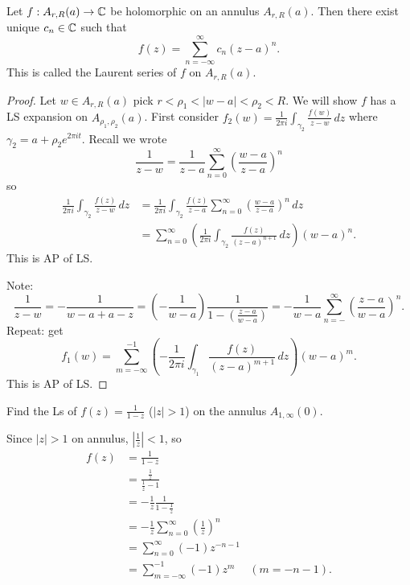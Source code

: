 \documentclass[10pt, a4paper]{article}
\begin{document}
\begin{theorem}
    Let $f : A_{r, R}(a) \to \mathbb{C}$ be holomorphic on an annulus $A_{r, R}(a)$.
    Then there exist unique $c_n \in \mathbb{C}$ such that
    \[
    f(z) = \sum_{n = -\infty}^{\infty}c_n(z - a) ^ n.
    \]
    This is called the Laurent series of $f$ on $A_{r, R}(a)$.

    \begin{proof}
        Let $w \in A_{r, R}(a)$ pick $r < \rho_1 < |w - a| < \rho_2 < R$.
        We will show $f$ has a LS expansion on $A_{\rho_1, \rho_2}(a)$.
        First consider $f_2(w) = \frac{1}{2\pi i}\int_{\gamma_2}\frac{f(w)}{z - w}\,dz$ where $\gamma_2 = a + \rho_2e ^ {2\pi it}$.
        Recall we wrote
        \[
        \frac{1}{z - w} = \frac{1}{z - a}\sum_{n = 0}^{\infty}\left(\frac{w - a}{z - a}\right) ^ n
        \]
        so
        \begin{align*}
            \frac{1}{2\pi i}\int_{\gamma_2}\frac{f(z)}{z - w}\,dz &= \frac{1}{2\pi i}\int_{\gamma_2}\frac{f(z)}{z - a}\sum_{n = 0}^{\infty}\left(\frac{w - a}{z - a}\right) ^ n\,dz \\
            &= \sum_{n = 0}^{\infty}\left(\frac{1}{2\pi i}\int_{\gamma_2}\frac{f(z)}{(z - a) ^ {n + 1}}\,dz\right)(w - a) ^ n.
        \end{align*}
        This is $\mathrm{AP}$ of LS.

        Note:
        \[
        \frac{1}{z - w} = -\frac{1}{w - a + a - z} = \left(-\frac{1}{w - a}\right)\frac{1}{1 - \left(\frac{z - a}{w - a}\right)} = -\frac{1}{w - a}\sum_{n = -}^{\infty}\left(\frac{z - a}{w - a}\right) ^ n.
        \]
        Repeat:
        get
        \[
        f_1(w) = \sum_{m = -\infty}^{-1}\left(-\frac{1}{2\pi i}\int_{\gamma_1}\frac{f(z)}{(z - a) ^ {m + 1}}\,dz\right)(w - a) ^ m.
        \]
        This is $\mathrm{AP}$ of LS.
    \end{proof}
\end{theorem}

\begin{example}
    Find the Ls of $f(z) = \frac{1}{1 - z}$
    ($|z| > 1$)
    on the annulus $A_{1, \infty}(0)$.

    \begin{solution}
        Since $|z| > 1$ on annulus,
        $\left|\frac{1}{z}\right| < 1$,
        so
        \begin{align*}
            f(z) &= \frac{1}{1 - z} \\
            &= \frac{\frac{1}{z}}{\frac{1}{z} - 1} \\
            &= -\frac{1}{z}\frac{1}{1 - \frac{1}{z}} \\
            &= -\frac{1}{z}\sum_{n = 0}^{\infty}\left(\frac{1}{z}\right) ^ n \\
            &= \sum_{n = 0}^{\infty}(-1)z ^ {-n - 1} \\
            &= \sum_{m = -\infty}^{-1}(-1)z ^ m &(m = -n - 1).
        \end{align*}
    \end{solution}
\end{example}
\end{document}
